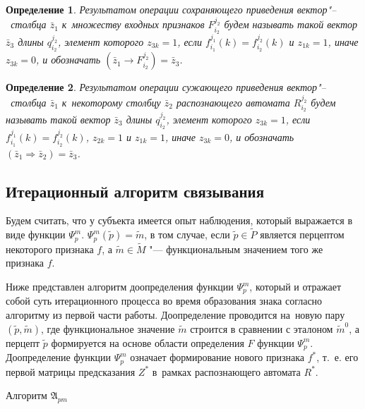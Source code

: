 \documentclass[a4paper, 12pt]{article}
\theoremstyle{plain}
\newtheorem{Def}{Определение}
\newcommand{\stretchsize}{2}
\renewcommand{\baselinestretch}{\stretchsize}
\begin{document}
	\begin{Def}
		Результатом операции сохраняющего приведения вектор"--~столбца $\bar z_1$ к~множеству входных признаков $F_{i_2}^{j_2}$ будем называть такой вектор $\bar z_3$ длины $q_{i_2}^{j_2}$, элемент которого $z_{3k}=1$, если $f_{i_1}^{j_1}(k)=f_{i_2}^{j_2}(k)$ и $z_{1k}=1$, иначе $z_{3k}=0$, и обозначать $(\bar z_1\rightarrow F_{i_2}^{j_2})=\bar z_3$.
	\end{Def}
	
	\begin{Def}
		Результатом операции сужающего приведения вектор"--~столбца $\bar z_1$ к~некоторому столбцу $\bar z_2$ распознающего автомата $R_{i_2}^{j_2}$ будем называть такой вектор $\bar z_3$ длины $q_{i_2}^{j_2}$, элемент которого $z_{3k}=1$, если $f_{i_1}^{j_1}(k)=f_{i_2}^{j_2}(k)$, $z_{2k}=1$ и $z_{1k}=1$, иначе $z_{3k}=0$, и обозначать $(\bar z_1\Rightarrow \bar z_2)=\bar z_3$.
	\end{Def}
	
	\subsection{Итерационный алгоритм связывания}
	Будем считать, что у субъекта имеется опыт наблюдения, который выражается в виде функции $\Psi_p^m$. $\Psi_p^m(\tilde p)=\tilde m$, в том случае, если $\tilde p\in\tilde P$ является перцептом некоторого признака $f$, а $\tilde m\in\tilde M$ "--- функциональным значением того же признака $f$.
	
	Ниже представлен алгоритм доопределения функции $\Psi_p^m$, который и отражает собой суть итерационного процесса во время образования знака согласно алгоритму из первой части работы. Доопределение проводится на~новую пару $(\tilde p,\tilde m)$, где функциональное значение $\tilde m$ строится в сравнении с эталоном $\tilde m^0$, а перцепт $\tilde p$ формируется на основе области определения $\hat F$ функции $\Psi_p^m$. Доопределение функции $\Psi_p^m$ означает формирование нового признака $f^*$, т.~е. его первой матрицы предсказания $Z^*$ в~рамках распознающего автомата $R^*$.

	\renewcommand{\baselinestretch}{1}				
	\begin{algorithm}[h]
		\caption{Алгоритм $\mathfrak{A}_{pm}$}\label{alg:pm}
		\begin{algorithmic}[1]
			
		\end{algorithmic}			
	\end{algorithm}
	\renewcommand{\baselinestretch}{\stretchsize}
		
\end{document}
